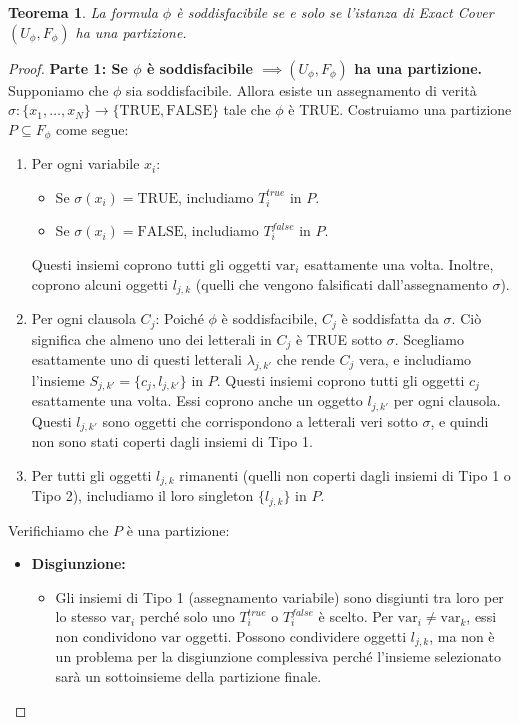 \documentclass[a4paper]{article}
\newtheorem{theorem}{Teorema}
\begin{document}
\begin{theorem}
La formula $\phi$ è soddisfacibile se e solo se l'istanza di Exact Cover $(U_\phi, F_\phi)$ ha una partizione.
\end{theorem}
\begin{proof}
\textbf{Parte 1: Se $\phi$ è soddisfacibile $\implies (U_\phi, F_\phi)$ ha una partizione.}
Supponiamo che $\phi$ sia soddisfacibile. Allora esiste un assegnamento di verità $\sigma: \{x_1, \ldots, x_N\} \to \{\text{TRUE}, \text{FALSE}\}$ tale che $\phi$ è TRUE. Costruiamo una partizione $P \subseteq F_\phi$ come segue:
\begin{enumerate}
    \item Per ogni variabile $x_i$:
    \begin{itemize}
        \item Se $\sigma(x_i) = \text{TRUE}$, includiamo $T_i^{true}$ in $P$.
        \item Se $\sigma(x_i) = \text{FALSE}$, includiamo $T_i^{false}$ in $P$.
    \end{itemize}
    Questi insiemi coprono tutti gli oggetti $\text{var}_i$ esattamente una volta. Inoltre, coprono alcuni oggetti $l_{j,k}$ (quelli che vengono falsificati dall'assegnamento $\sigma$).
    \item Per ogni clausola $C_j$:
    Poiché $\phi$ è soddisfacibile, $C_j$ è soddisfatta da $\sigma$. Ciò significa che almeno uno dei letterali in $C_j$ è TRUE sotto $\sigma$. Scegliamo esattamente uno di questi letterali $\lambda_{j,k'}$ che rende $C_j$ vera, e includiamo l'insieme $S_{j,k'} = \{c_j, l_{j,k'}\}$ in $P$.
    Questi insiemi coprono tutti gli oggetti $c_j$ esattamente una volta. Essi coprono anche un oggetto $l_{j,k'}$ per ogni clausola. Questi $l_{j,k'}$ sono oggetti che corrispondono a letterali veri sotto $\sigma$, e quindi non sono stati coperti dagli insiemi di Tipo 1.
    \item Per tutti gli oggetti $l_{j,k}$ rimanenti (quelli non coperti dagli insiemi di Tipo 1 o Tipo 2), includiamo il loro singleton $\{l_{j,k}\}$ in $P$.
\end{enumerate}
Verifichiamo che $P$ è una partizione:
\begin{itemize}
    \item \textbf{Disgiunzione:}
    \begin{itemize}
        \item Gli insiemi di Tipo 1 (assegnamento variabile) sono disgiunti tra loro per lo stesso $\text{var}_i$ perché solo uno $T_i^{true}$ o $T_i^{false}$ è scelto. Per $\text{var}_i \ne \text{var}_k$, essi non condividono $\text{var}$ oggetti. Possono condividere oggetti $l_{j,k}$, ma non è un problema per la disgiunzione complessiva perché l'insieme selezionato sarà un sottoinsieme della partizione finale.

\end{itemize}
\end{itemize}
\end{proof}
\end{document}
